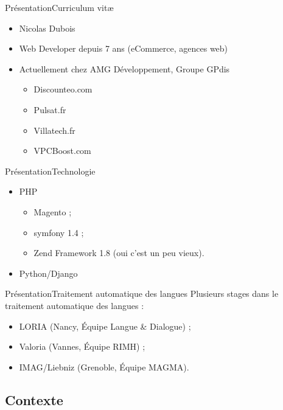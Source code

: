 \documentclass[notes]{beamer}
\begin{document}
\begin{frame}{Présentation}{Curriculum vit\ae}
    \pause
    \begin{itemize}[<+->]
    \item Nicolas Dubois
    \item Web Developer depuis 7 ans (eCommerce, agences web)
    \item Actuellement chez AMG Développement, Groupe GPdis
        \begin{itemize}
        \item Discounteo.com
        \item Pulsat.fr
        \item Villatech.fr
        \item VPCBoost.com
        \end{itemize}
    \end{itemize}
\end{frame}

\begin{frame}{Présentation}{Technologie}
    \pause
    \begin{itemize}[<+->]
    \item PHP
        \begin{itemize}
        \item Magento ;
        \item symfony 1.4 ;
        \item Zend Framework 1.8 (oui c'est un peu vieux).
        \end{itemize}
    \item Python/Django
    \end{itemize}
    \pause
    \begin{center}
    \end{center}
\end{frame}

\begin{frame}{Présentation}{Traitement automatique des langues}
    \pause
    Plusieurs stages dans le traitement automatique des langues :
    \pause
    \begin{itemize}[<+->]
    \item LORIA (Nancy, Équipe Langue \&{} Dialogue) ;
    \item Valoria (Vannes, Équipe RIMH) ;
    \item IMAG/Liebniz (Grenoble, Équipe MAGMA).
    \end{itemize}
\end{frame}

\subsection{Contexte}
\end{document}
